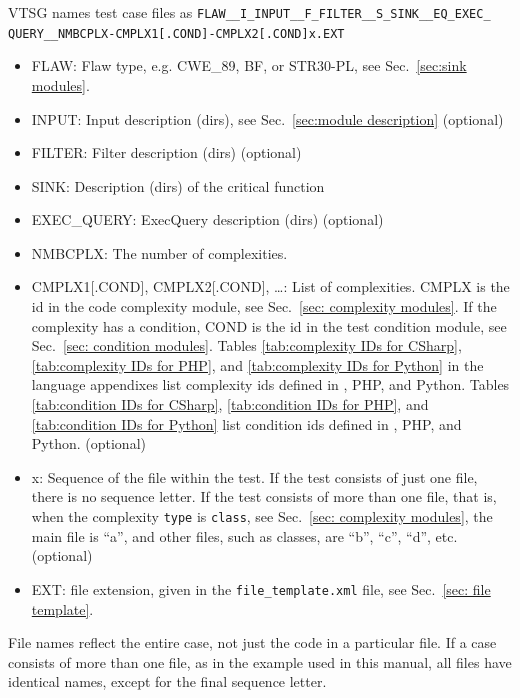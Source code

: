VTSG names test case files as
\verb|FLAW__I_INPUT__F_FILTER__S_SINK__EQ_EXEC_| \\
\verb|QUERY__NMBCPLX-CMPLX1[.COND]-CMPLX2[.COND]x.EXT|
\begin{itemize}[nosep]
    \item FLAW: Flaw type, e.g. CWE\_89, BF, or STR30-PL, see
	Sec.~\ref{sec:sink modules}.
    \item INPUT: Input description (dirs), see Sec.~\ref{sec:module description} (optional)
    \item FILTER:  Filter description (dirs) (optional)
    \item SINK:  Description (dirs) of the critical function
    \item EXEC\_QUERY:  ExecQuery description (dirs) (optional)

    \item NMBCPLX:  The number of complexities.
    \item CMPLX1[.COND], CMPLX2[.COND], \ldots: List of complexities.
            CMPLX is the id in the code complexity module,
            see Sec.~\ref{sec: complexity modules}.
            If the complexity has a
            condition, COND is the id in the test condition module,
            see Sec.~\ref{sec: condition modules}.
            Tables \ref{tab:complexity IDs for CSharp},
            \ref{tab:complexity IDs for PHP}, and
            \ref{tab:complexity IDs for Python} in the language appendixes list
            complexity ids defined in \CSharp, PHP, and Python.
            Tables \ref{tab:condition IDs for CSharp},
            \ref{tab:condition IDs for PHP}, and
            \ref{tab:condition IDs for Python} list condition
            ids defined in \CSharp, PHP, and Python. (optional)
    \item x: Sequence of the file within the test.  If the test consists of just one
      file, there is no sequence letter.  If the test consists of more than one file,
      that is, when the complexity \verb|type| is \verb|class|,
      see Sec.~\ref{sec: complexity modules},
      the main file is ``a'', and other files, such as classes, are ``b'', ``c'',
      ``d'', etc. (optional)
    \item EXT: file extension, given in the \verb|file_template.xml| file, see
    Sec.~\ref{sec: file template}.
\end{itemize}

File names reflect the entire case, not just the code in a
particular file.  If a case consists of more than one file, as in the
example used in this manual, all files have
identical names, except for the final sequence letter.

